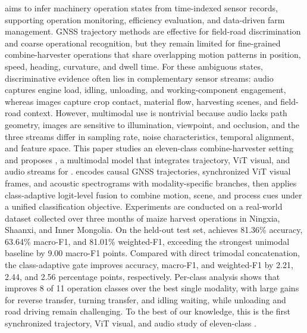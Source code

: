 \task{} aims to infer machinery operation states from time-indexed sensor records, supporting operation monitoring, efficiency evaluation, and data-driven farm management.
GNSS trajectory methods are effective for field-road discrimination and coarse operational recognition, but they remain limited for fine-grained combine-harvester operations that share overlapping motion patterns in position, speed, heading, curvature, and dwell time.
For these ambiguous states, discriminative evidence often lies in complementary sensor streams: audio captures engine load, idling, unloading, and working-component engagement, whereas images capture crop contact, material flow, harvesting scenes, and field-road context.
However, multimodal use is nontrivial because audio lacks path geometry, images are sensitive to illumination, viewpoint, and occlusion, and the three streams differ in sampling rate, noise characteristics, temporal alignment, and feature space.
This paper studies an eleven-class combine-harvester setting and proposes \ours{}, a multimodal model that integrates trajectory, ViT visual, and audio streams for \task{}.
\ours{} encodes causal GNSS trajectories, synchronized ViT visual frames, and acoustic spectrograms with modality-specific branches, then applies class-adaptive logit-level fusion to combine motion, scene, and process cues under a unified classification objective.
Experiments are conducted on a real-world dataset collected over three months of maize harvest operations in Ningxia, Shaanxi, and Inner Mongolia.
On the held-out test set, \ours{} achieves 81.36\% accuracy, 63.64\% macro-F1, and 81.01\% weighted-F1, exceeding the strongest unimodal baseline by 9.00 macro-F1 points.
Compared with direct trimodal concatenation, the class-adaptive gate improves accuracy, macro-F1, and weighted-F1 by 2.21, 2.44, and 2.56 percentage points, respectively.
Per-class analysis shows that \ours{} improves 8 of 11 operation classes over the best single modality, with large gains for reverse transfer, turning transfer, and idling waiting, while unloading and road driving remain challenging.
To the best of our knowledge, this is the first synchronized trajectory, ViT visual, and audio study of eleven-class \task{}.
